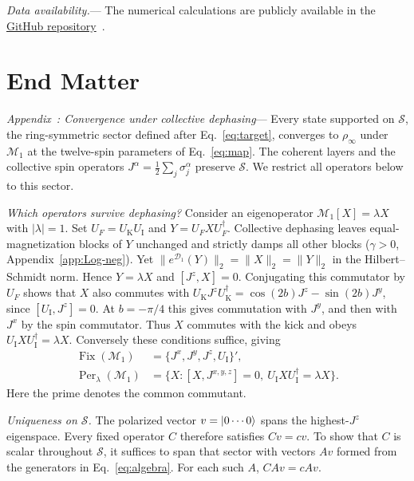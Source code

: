 \documentclass[aps,prl,reprint,amsmath,amssymb,floatfix,superscriptaddress]{revtex4-2}
\newcommand{\UK}{U_{\mathrm K}}
\newcommand{\UI}{U_{\mathrm I}}
\begin{document}
\emph{Data availability.}---
The numerical calculations are publicly available in the \href{https://github.com/bhavaytyagi/extracting-operational-entanglement-from-a-noise-protected-many-body-system}{GitHub repository}~\cite{Tyagi2026Data}.




\clearpage

\section*{End Matter}
\appendix
\newcommand{\prlappendix}[1]{\par\addvspace{4pt}\noindent\textit{Appendix~\thesection: #1}---}

\prlappendix{Convergence under collective dephasing}
\label{App:A}
Every state supported on $\mathcal S$, the ring-symmetric sector defined after Eq.~\eqref{eq:target}, converges to $\rho_\infty$ under $\mathcal M_1$ at the twelve-spin parameters of Eq.~\eqref{eq:map}. The coherent layers and the collective spin operators $J^\alpha=\tfrac12\sum_j\sigma_j^\alpha$ preserve $\mathcal S$. We restrict all operators below to this sector.

\emph{Which operators survive dephasing?} Consider an eigenoperator $\mathcal M_1[X]=\lambda X$ with $|\lambda|=1$. Set $U_F=\UK\UI$ and $Y=U_F X U_F^\dagger$. Collective dephasing leaves equal-magnetization blocks of $Y$ unchanged and strictly damps all other blocks ($\gamma>0$, Appendix~\ref{app:Log-neg}). Yet $\|e^{\mathcal D_1}(Y)\|_2=\|X\|_2=\|Y\|_2$ in the Hilbert--Schmidt norm. Hence $Y=\lambda X$ and $[J^z,X]=0$. Conjugating this commutator by $U_F$ shows that $X$ also commutes with $\UK J^z\UK^\dagger=\cos(2b)J^z-\sin(2b)J^y$, since $[\UI,J^z]=0$. At $b=-\pi/4$ this gives commutation with $J^y$, and then with $J^x$ by the spin commutator. Thus $X$ commutes with the kick and obeys $\UI X\UI^\dagger=\lambda X$. Conversely these conditions suffice, giving
\begin{align}
\operatorname{Fix}(\mathcal M_1)&=\{J^x,J^y,J^z,\UI\}',\nonumber\\
\operatorname{Per}_\lambda(\mathcal M_1)&=\{X:[X,J^{x,y,z}]=0,\ \UI X\UI^\dagger=\lambda X\}.
\label{eq:algebra}
\end{align}
Here the prime denotes the common commutant.

\emph{Uniqueness on $\mathcal S$.} The polarized vector $v=\ket{0\cdots 0}$ spans the highest-$J^z$ eigenspace. Every fixed operator $C$ therefore satisfies $Cv=cv$. To show that $C$ is scalar throughout $\mathcal S$, it suffices to span that sector with vectors $Av$ formed from the generators in Eq.~\eqref{eq:algebra}. For each such $A$, $CAv=cAv$.
\end{document}
